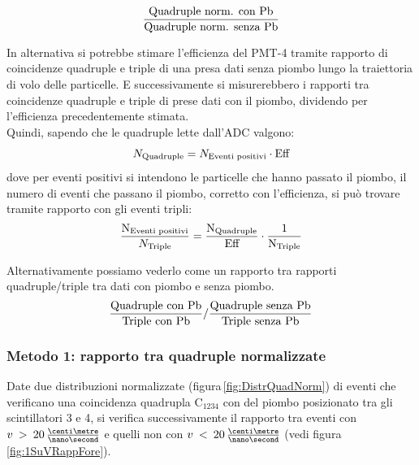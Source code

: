 \documentclass[a4paper,twocolumn]{article}
\begin{document}
\begin{equation}
\frac{\textnormal{Quadruple norm. con Pb}}{\textnormal{Quadruple norm. senza Pb}}
\label{equ:RappQuadNorm}
\end{equation}

In alternativa si potrebbe stimare l'efficienza del PMT-4 tramite rapporto di coincidenze quadruple e triple di una presa dati senza piombo lungo la traiettoria di volo delle particelle.
E successivamente si misurerebbero i rapporti tra coincidenze quadruple e triple di prese dati con il piombo, dividendo per l'efficienza precedentemente stimata.\\
Quindi, sapendo che le quadruple lette dall'ADC valgono:
\begin{equation}
N_{\textnormal{Quadruple}} = N_{\textnormal{Eventi positivi}} \cdot \textnormal{Eff} 
\end{equation}
dove per eventi positivi si intendono le particelle che hanno passato il piombo, il numero di eventi che passano il piombo, corretto con l'efficienza, si può trovare tramite rapporto con gli eventi tripli:
\begin{equation}
\frac{\textnormal{N}_{\textnormal{Eventi positivi}}}{N_{\textnormal{Triple}}} = \frac{\textnormal{N}_{\textnormal{Quadruple}}}{\textnormal{Eff}}\cdot\frac{1}{\textnormal{N}_{\textnormal{Triple}}}
\label{equ:VRappMet2}
\end{equation}

Alternativamente possiamo vederlo come un rapporto tra rapporti quadruple/triple tra dati con piombo e senza piombo.
\begin{equation}
\frac{\textnormal{Quadruple con Pb}}{\textnormal{Triple con Pb}} / \frac{\textnormal{Quadruple senza Pb}}{\textnormal{Triple senza Pb}}
\label{equ:RappEff}
\end{equation}

\subsubsection*{Metodo 1: rapporto tra  quadruple normalizzate}
Date due distribuzioni normalizzate (figura\,\ref{fig:DistrQuadNorm}) di eventi che verificano una coincidenza quadrupla C$_{1234}$ con del piombo posizionato tra gli scintillatori 3 e 4, si verifica successivamente il rapporto tra eventi con $v\:>\:20\,\frac{\centi\metre}{\nano\second}$ e quelli non con $v\:<\:20\,\frac{\centi\metre}{\nano\second}$ (vedi figura\,\ref{fig:1SuVRappFore}).
\end{document}
